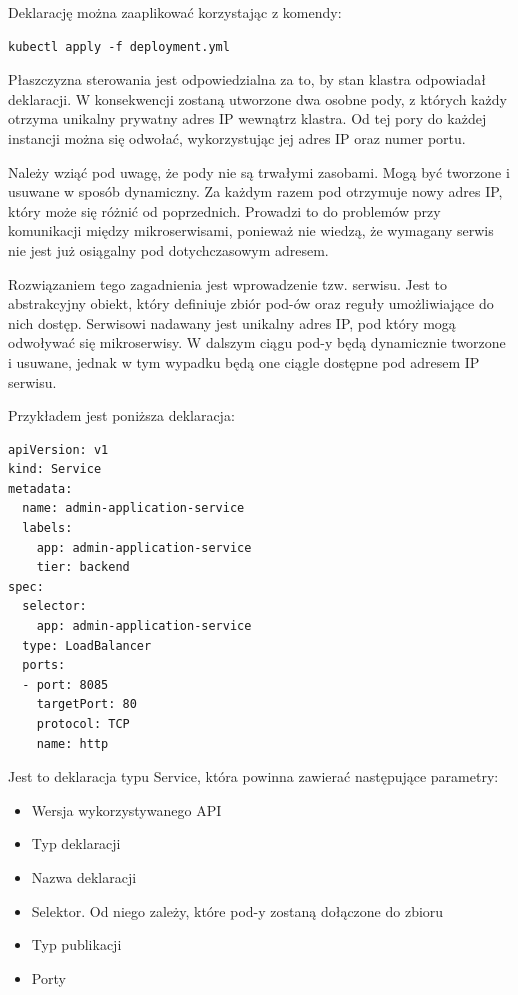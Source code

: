 \documentclass[11pt, a4]{article} %
\begin{document}
Deklarację można zaaplikować korzystając z komendy:

\begin{lstlisting}
kubectl apply -f deployment.yml
\end{lstlisting}

Płaszczyzna sterowania jest odpowiedzialna za to, by stan klastra odpowiadał 
deklaracji. W konsekwencji zostaną utworzone dwa osobne pody, z których każdy otrzyma 
unikalny prywatny adres IP wewnątrz klastra. Od tej pory do każdej instancji można 
się odwołać, wykorzystując jej adres IP oraz numer portu.

Należy wziąć pod uwagę, że pody nie są trwałymi zasobami. Mogą być tworzone i usuwane 
w sposób dynamiczny. Za każdym razem pod otrzymuje nowy adres IP, który może się 
różnić od poprzednich. Prowadzi to do problemów przy komunikacji między 
mikroserwisami, ponieważ nie wiedzą, że wymagany serwis nie jest już osiągalny pod 
dotychczasowym adresem.

Rozwiązaniem tego zagadnienia jest wprowadzenie tzw. serwisu. Jest to abstrakcyjny 
obiekt, który definiuje zbiór pod-ów oraz reguły umożliwiające do nich dostęp. 
Serwisowi nadawany jest unikalny adres IP, pod który mogą odwoływać się mikroserwisy. 
W dalszym ciągu pod-y będą dynamicznie tworzone i usuwane, jednak w tym wypadku będą 
one ciągle dostępne pod adresem IP serwisu.

Przykładem jest poniższa deklaracja:

\begin{lstlisting}
apiVersion: v1
kind: Service
metadata:
  name: admin-application-service
  labels:
    app: admin-application-service
    tier: backend
spec:
  selector:
    app: admin-application-service
  type: LoadBalancer
  ports:
  - port: 8085
    targetPort: 80
    protocol: TCP
    name: http 
\end{lstlisting}

Jest to deklaracja typu Service, która powinna zawierać następujące parametry:

\begin{itemize} %
    \item Wersja wykorzystywanego API
    \item Typ deklaracji
    \item Nazwa deklaracji
    \item Selektor. Od niego zależy, które pod-y zostaną dołączone do zbioru
    \item Typ publikacji
    \item Porty
\end{itemize}
\end{document}

